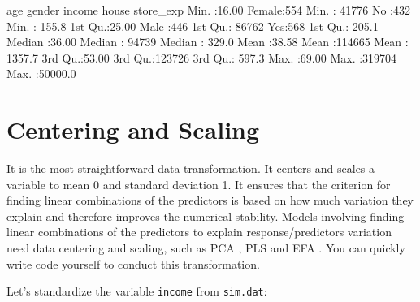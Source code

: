 \documentclass[
  12pt,
]{krantz}
\makeatletter
\newenvironment{Shaded}{\begin{snugshade}}{\end{snugshade}}
\newcommand{\AttributeTok}[1]{\textcolor[rgb]{0.61,0.61,0.61}{#1}}
\newcommand{\CommentTok}[1]{\textcolor[rgb]{0.37,0.37,0.37}{\textit{#1}}}
\newcommand{\FunctionTok}[1]{\textcolor[rgb]{0,0,0}{#1}}
\newcommand{\NormalTok}[1]{#1}
\newcommand{\OtherTok}[1]{\textcolor[rgb]{0.37,0.37,0.37}{#1}}
\newcommand{\SpecialCharTok}[1]{\textcolor[rgb]{0,0,0}{#1}}
\newenvironment{kframe}{%
\medskip{}
\setlength{\fboxsep}{.8em}
 \def\at@end@of@kframe{}%
 \ifinner\ifhmode%
  \def\at@end@of@kframe{\end{minipage}}%
  \begin{minipage}{\columnwidth}%
 \fi\fi%
 \def\FrameCommand##1{\hskip\@totalleftmargin \hskip-\fboxsep
 \colorbox{shadecolor}{##1}\hskip-\fboxsep
     \hskip-\linewidth \hskip-\@totalleftmargin \hskip\columnwidth}%
 \MakeFramed {\advance\hsize-\width
   \@totalleftmargin\z@ \linewidth\hsize
   \@setminipage}}%
 {\par\unskip\endMakeFramed%
 \at@end@of@kframe}
\renewenvironment{Shaded}{\begin{kframe}}{\end{kframe}}
\makeatother
\begin{document}
\begin{Shaded}
\begin{Highlighting}[]
\NormalTok{      age           gender        income       house       store\_exp      }
\NormalTok{ Min.   :16.00   Female:554   Min.   : 41776   No :432   Min.   :  155.8  }
\NormalTok{ 1st Qu.:25.00   Male  :446   1st Qu.: 86762   Yes:568   1st Qu.:  205.1  }
\NormalTok{ Median :36.00                Median : 94739             Median :  329.0  }
\NormalTok{ Mean   :38.58                Mean   :114665             Mean   : 1357.7  }
\NormalTok{ 3rd Qu.:53.00                3rd Qu.:123726             3rd Qu.:  597.3  }
\NormalTok{ Max.   :69.00                Max.   :319704             Max.   :50000.0  }
\end{Highlighting}
\end{Shaded}

\hypertarget{centering-and-scaling}{%
\section{Centering and Scaling}\label{centering-and-scaling}}

It is the most straightforward data transformation. It centers and scales a variable to mean 0 and standard deviation 1. It ensures that the criterion for finding linear combinations of the predictors is based on how much variation they explain and therefore improves the numerical stability. Models involving finding linear combinations of the predictors to explain response/predictors variation need data centering and scaling, such as PCA \citep{pca1}, PLS \citep{PLS1} and EFA \citep{EFA1}. You can quickly write code yourself to conduct this transformation.

Let's standardize the variable \texttt{income} from \texttt{sim.dat}:

\begin{Shaded}
\end{Shaded}
\end{document}
